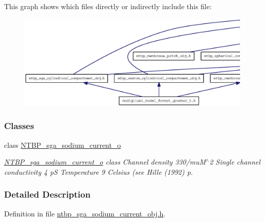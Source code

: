 This graph shows which files directly or indirectly include this file:
\nopagebreak
\begin{figure}[H]
\begin{center}
\leavevmode
\includegraphics[width=400pt]{ntbp__sga__sodium__current__obj_8h__dep__incl}
\end{center}
\end{figure}
\subsubsection*{Classes}
\begin{DoxyCompactItemize}
\item 
class \hyperlink{class_n_t_b_p__sga__sodium__current__o}{NTBP\_\-sga\_\-sodium\_\-current\_\-o}
\begin{DoxyCompactList}\small\item\em \hyperlink{class_n_t_b_p__sga__sodium__current__o}{NTBP\_\-sga\_\-sodium\_\-current\_\-o} class Channel density 330/muM$^\wedge$2 Single channel conductivity 4 pS Temperature 9 Celsius (see Hille (1992) p. \item\end{DoxyCompactList}\end{DoxyCompactItemize}


\subsubsection{Detailed Description}


Definition in file \hyperlink{ntbp__sga__sodium__current__obj_8h_source}{ntbp\_\-sga\_\-sodium\_\-current\_\-obj.h}.

